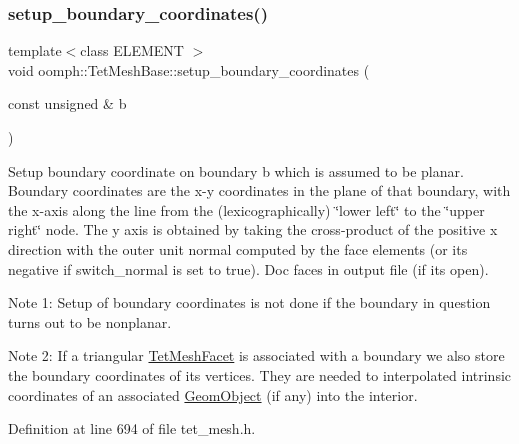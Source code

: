 \subsubsection{\texorpdfstring{setup\+\_\+boundary\+\_\+coordinates()}{setup\_boundary\_coordinates()}\hspace{0.1cm}{\footnotesize\ttfamily [1/4]}}
{\footnotesize\ttfamily template$<$class E\+L\+E\+M\+E\+NT $>$ \\
void oomph\+::\+Tet\+Mesh\+Base\+::setup\+\_\+boundary\+\_\+coordinates (\begin{DoxyParamCaption}\item[{const unsigned \&}]{b }\end{DoxyParamCaption})\hspace{0.3cm}{\ttfamily [inline]}}



Setup boundary coordinate on boundary b which is assumed to be planar. Boundary coordinates are the x-\/y coordinates in the plane of that boundary, with the x-\/axis along the line from the (lexicographically) \char`\"{}lower left\char`\"{} to the \char`\"{}upper right\char`\"{} node. The y axis is obtained by taking the cross-\/product of the positive x direction with the outer unit normal computed by the face elements (or its negative if switch\+\_\+normal is set to true). Doc faces in output file (if it\textquotesingle{}s open). 

Note 1\+: Setup of boundary coordinates is not done if the boundary in question turns out to be nonplanar.

Note 2\+: If a triangular \hyperlink{classoomph_1_1TetMeshFacet}{Tet\+Mesh\+Facet} is associated with a boundary we also store the boundary coordinates of its vertices. They are needed to interpolated intrinsic coordinates of an associated \hyperlink{classoomph_1_1GeomObject}{Geom\+Object} (if any) into the interior. 

Definition at line 694 of file tet\+\_\+mesh.\+h.

\mbox{\label{classoomph_1_1TetMeshBase_a310a2204aabf22555f22ca9117e9ebc7}} 

